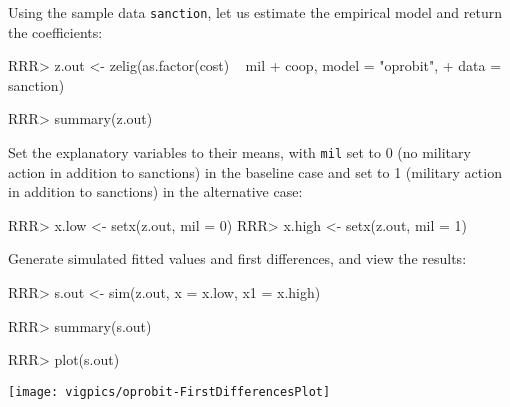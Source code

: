 \begin{enumerate}
Using the sample data \texttt{sanction}, let us estimate the empirical model and return the coefficients:
\begin{Schunk}
\begin{Sinput}
RRR>  z.out <- zelig(as.factor(cost) ~ mil + coop, model = "oprobit", 
+                  data = sanction)
\end{Sinput}
\end{Schunk}
\begin{Schunk}
\begin{Sinput}
RRR> summary(z.out)
\end{Sinput}
\end{Schunk}
Set the explanatory variables to their means, with {\tt mil} set
to 0 (no military action in addition to sanctions) in the baseline
case and set to 1 (military action in addition to sanctions) in the
alternative case:
\begin{Schunk}
\begin{Sinput}
RRR>  x.low <- setx(z.out, mil = 0)
RRR>  x.high <- setx(z.out, mil = 1)
\end{Sinput}
\end{Schunk}
Generate simulated fitted values and first differences, and view the results:
\begin{Schunk}
\begin{Sinput}
RRR>  s.out <- sim(z.out, x = x.low, x1 = x.high)
\end{Sinput}
\end{Schunk}
\begin{Schunk}
\begin{Sinput}
RRR> summary(s.out)
\end{Sinput}
\end{Schunk}
\begin{center}
\begin{Schunk}
\begin{Sinput}
RRR>  plot(s.out)
\end{Sinput}
\end{Schunk}
\texttt{[image: vigpics/oprobit-FirstDifferencesPlot]}
\end{center}
\end{enumerate}

